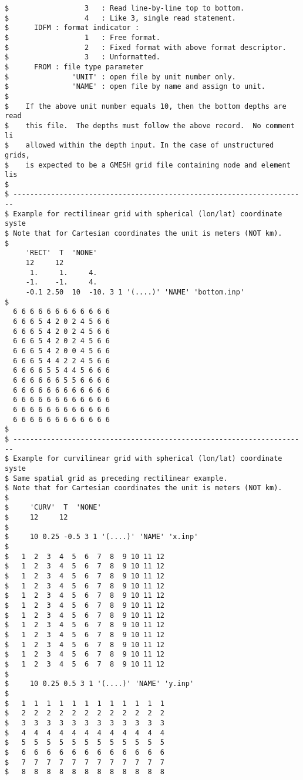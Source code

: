 \begin{footnotesize}
\begin{verbatim}
$                  3   : Read line-by-line top to bottom.
$                  4   : Like 3, single read statement.
$      IDFM : format indicator :
$                  1   : Free format.
$                  2   : Fixed format with above format descriptor.
$                  3   : Unformatted.
$      FROM : file type parameter
$               'UNIT' : open file by unit number only.
$               'NAME' : open file by name and assign to unit.
$
$    If the above unit number equals 10, then the bottom depths are read
$    this file.  The depths must follow the above record.  No comment li
$    allowed within the depth input. In the case of unstructured grids, 
$    is expected to be a GMESH grid file containing node and element lis
$
$ ----------------------------------------------------------------------
$ Example for rectilinear grid with spherical (lon/lat) coordinate syste
$ Note that for Cartesian coordinates the unit is meters (NOT km).
$
     'RECT'  T  'NONE'
     12     12
      1.     1.     4.
     -1.    -1.     4.
     -0.1 2.50  10  -10. 3 1 '(....)' 'NAME' 'bottom.inp'
$
  6 6 6 6 6 6 6 6 6 6 6 6
  6 6 6 5 4 2 0 2 4 5 6 6
  6 6 6 5 4 2 0 2 4 5 6 6
  6 6 6 5 4 2 0 2 4 5 6 6
  6 6 6 5 4 2 0 0 4 5 6 6
  6 6 6 5 4 4 2 2 4 5 6 6
  6 6 6 6 5 5 4 4 5 6 6 6
  6 6 6 6 6 6 5 5 6 6 6 6
  6 6 6 6 6 6 6 6 6 6 6 6
  6 6 6 6 6 6 6 6 6 6 6 6
  6 6 6 6 6 6 6 6 6 6 6 6
  6 6 6 6 6 6 6 6 6 6 6 6
$
$ ----------------------------------------------------------------------
$ Example for curvilinear grid with spherical (lon/lat) coordinate syste
$ Same spatial grid as preceding rectilinear example.
$ Note that for Cartesian coordinates the unit is meters (NOT km).
$
$     'CURV'  T  'NONE'
$     12     12
$
$     10 0.25 -0.5 3 1 '(....)' 'NAME' 'x.inp'
$
$   1  2  3  4  5  6  7  8  9 10 11 12
$   1  2  3  4  5  6  7  8  9 10 11 12
$   1  2  3  4  5  6  7  8  9 10 11 12
$   1  2  3  4  5  6  7  8  9 10 11 12
$   1  2  3  4  5  6  7  8  9 10 11 12
$   1  2  3  4  5  6  7  8  9 10 11 12
$   1  2  3  4  5  6  7  8  9 10 11 12
$   1  2  3  4  5  6  7  8  9 10 11 12
$   1  2  3  4  5  6  7  8  9 10 11 12
$   1  2  3  4  5  6  7  8  9 10 11 12
$   1  2  3  4  5  6  7  8  9 10 11 12
$   1  2  3  4  5  6  7  8  9 10 11 12
$
$     10 0.25 0.5 3 1 '(....)' 'NAME' 'y.inp'
$
$   1  1  1  1  1  1  1  1  1  1  1  1
$   2  2  2  2  2  2  2  2  2  2  2  2
$   3  3  3  3  3  3  3  3  3  3  3  3
$   4  4  4  4  4  4  4  4  4  4  4  4
$   5  5  5  5  5  5  5  5  5  5  5  5
$   6  6  6  6  6  6  6  6  6  6  6  6
$   7  7  7  7  7  7  7  7  7  7  7  7
$   8  8  8  8  8  8  8  8  8  8  8  8

\end{verbatim}
\end{footnotesize}

